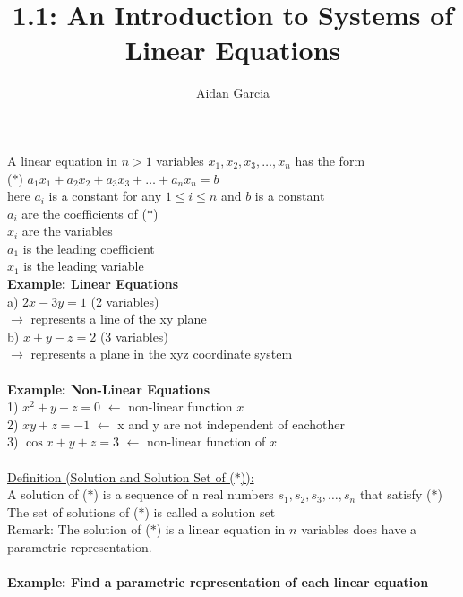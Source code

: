\documentclass{jhwhw}
\author{Aidan Garcia}
\title{1.1: An Introduction to Systems of Linear Equations}
\begin{document}
A linear equation in \(n>1\) variables \(x_1,x_2,x_3,\ldots,x_n\) has the form
\\
(\(\ast\)) \(a_1 x_1 + a_2 x_2 + a_3 x_3 +\ldots+a_n x_n=b\)
\\

here \(a_i\) is a constant for any \(1 \leq i \leq n\) and \(b\) is a constant
\\

\(a_i\) are the coefficients of (\(\ast\)) \\
\(x_i\) are the variables \\
\(a_1\) is the leading coefficient \\
\(x_1\) is the leading variable
\\

\textbf{Example: Linear Equations}
\\
a) \(2x-3y=1\) (2 variables) \\
\(\rightarrow\) represents a line of the xy plane 
\\
b) \(x+y-z=2\) (3 variables) \\
\(\rightarrow\) represents a plane in the xyz coordinate system
\\ \\

\textbf{Example: Non-Linear Equations}
\\
1) \( \boxed{x^2} + y + z =0\) \(\leftarrow\) non-linear function \(x\)
\\
2) \(\boxed{xy} + z = -1\) \(\leftarrow\) x and y are not independent of eachother
\\
3) \(\boxed{\cos x} + y + z = 3\) \(\leftarrow\) non-linear function of \(x\)
\\ \\

\underline{Definition (Solution and Solution Set of (\(\ast\))):}
\\

A solution of (\(\ast\)) is a sequence of n real numbers  \(s_1, s_2, s_3,\ldots,s_n\) that satisfy  (\(\ast\))
\\

The set of solutions of (\(\ast\)) is called a solution set
\\

Remark: The solution of (\(\ast\)) is a linear equation in \(n\) variables does have a parametric representation.
\\ \\

\textbf{Example: Find a parametric representation of each linear equation}
\\
\end{document}
